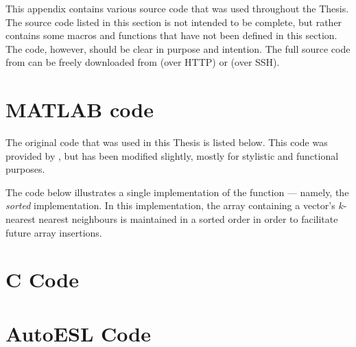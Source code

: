 This appendix contains various source code that was used throughout the Thesis.
The source code listed in this section is not intended to be complete, but
rather contains some macros and functions that have not been defined in this
section. The code, however, should be clear in purpose and intention. The full
source code from can be freely downloaded from \gitRepoHTTP{} (over HTTP) or
\gitRepoSSH{} (over SSH). 

\section{MATLAB code}
\label{sourceCode:matlab}
The original  code that was used in this Thesis is listed
below. This code was provided by \citeauthor{Khoa:2012}, but has been modified
slightly, mostly for stylistic and functional purposes.

The code below illustrates a single implementation of the
 function --- namely, the \emph{sorted}
implementation. In this implementation, the array containing a vector's
$k$-nearest nearest neighbours is maintained in a sorted order in order to
facilitate future array insertions.



\section{C Code}
\label{sourceCode:c}


\section{AutoESL Code}
\label{sourceCode:autoesl}

